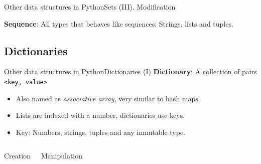 \documentclass[10pt,compress]{beamer} %
\begin{document}
\begin{frame}[plain]{Other data structures in Python}{Sets (III). Modification}
 	\vspace{-0.24cm}  
 	   \tiny{
		\begin{block}{}
		
		\vspace{-0.2cm}
		
		\vspace{-0.2cm}
		
		\end{block}
   }

	\vspace{0.1cm}
    \normalsize \textbf{Sequence}: All types that behaves like sequences: Strings, lists and tuples.
\end{frame}

\subsection{Dictionaries}
\begin{frame}{Other data structures in Python}{Dictionaries (I)}
	\textbf{Dictionary}: A collection of pairs \texttt{<key, value>}
		\begin{itemize}
		\item Also named as \textit{associative array}, very similar to hash maps.
		\item Lists are indexed with a number, dictionaries use keys.
		\item Key: Numbers, strings, tuples and any inmutable type.
		\end{itemize}

		\vspace{-0.3cm}
    \begin{columns}
 	   \column{.50\textwidth}
		\begin{block}{Creation}
		\vspace{-0.2cm}
		
		\vspace{-0.2cm}
		\end{block}
		\vspace{0.7cm}

		\begin{block}{Manipulation}
		\vspace{-0.2cm}
		
		\vspace{-0.2cm}
		\end{block}

	\end{columns}
\end{frame}
\end{document}
